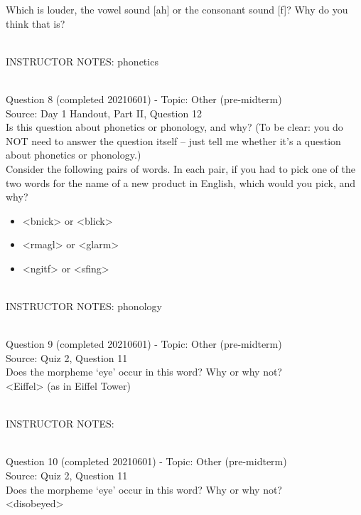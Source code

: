 \documentclass[12pt]{article}
\begin{document}
Which is louder, the vowel sound {[ah]} or the consonant sound {[f]}? Why do you think that is?


~\\
INSTRUCTOR NOTES: phonetics


~\\

{\large Question 8} (completed 20210601) - Topic: Other (pre-midterm)\\
Source: Day 1 Handout, Part II, Question 12\\

Is this question about phonetics or phonology, and why? (To be clear: you do NOT need to answer the question itself -- just tell me whether it's a question about phonetics or phonology.)\\

Consider the following pairs of words. In each pair, if you had to pick one of the two words for the name of a new product in English, which would you pick, and why? \begin{itemize} \item <bnick> or <blick> \item <rmagl> or <glarm> \item <ngitf> or <sfing> \end{itemize}


~\\
INSTRUCTOR NOTES: phonology


~\\

{\large Question 9} (completed 20210601) - Topic: Other (pre-midterm)\\
Source: Quiz 2, Question 11\\

Does the morpheme ‘eye’ occur in this word? Why or why not?\\

<Eiffel> (as in Eiffel Tower)


~\\
INSTRUCTOR NOTES: 


~\\

{\large Question 10} (completed 20210601) - Topic: Other (pre-midterm)\\
Source: Quiz 2, Question 11\\

Does the morpheme ‘eye’ occur in this word? Why or why not?\\

<disobeyed>
\end{document}
